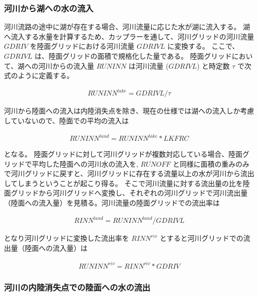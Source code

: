 \hypertarget{ux6cb3ux5dddux304bux3089ux6e56ux3078ux306eux6c34ux306eux6d41ux5165}{%
\subsubsection{河川から湖への水の流入}\label{ux6cb3ux5dddux304bux3089ux6e56ux3078ux306eux6c34ux306eux6d41ux5165}}

河川流路の途中に湖が存在する場合、河川流量に応じた水が湖に流入する。
湖へ流入する水量を計算するため、カップラーを通して、河川グリッドの河川流量
\(GDRIV\) を陸面グリッドにおける河川流量 \(GDRIVL\) に変換する。
ここで、 \(GDRIVL\) は、陸面グリッドの面積で規格化した量である。
陸面グリッドにおいて、湖への河川からの流入量 \(RUNINN\) は河川流量
(\(GDRIVL\)) と時定数 \(\tau\) で次式のように定義する。

\begin{eqnarray} RUNINN^{lake}=GDRIVL/\tau \end{eqnarray}

河川から陸面への流入は内陸消失点を除き、現在の仕様では湖への流入しか考慮していないので、陸面での平均の流入は

\begin{eqnarray} RUNINN^{land}=RUNINN^{lake}*LKFRC \end{eqnarray}

となる。
陸面グリッドに対して河川グリッドが複数対応している場合、陸面グリッドで平均した陸面への河川水の流入を,
\(RUNOFF\)
と同様に面積の重みのみで河川グリッドに戻すと、河川グリッドに存在する流量以上の水が河川から流出してしまうということが起こり得る。
そこで河川流量に対する流出量の比を陸面グリッドから河川グリッドへ変換し、それぞれの河川グリッドで河川流出量（陸面への流入量）を見積る。河川流量の陸面グリッドでの流出率は

\begin{eqnarray} RINN^{land}=RUNINN^{land}/GDRIVL \end{eqnarray}

となり河川グリッドに変換した流出率を \(RINN^{riv}\)
とすると河川グリッドでの流出量（陸面への流入量）は

\begin{eqnarray} RUNINN^{riv}=RINN^{riv}*GDRIV \end{eqnarray}

\hypertarget{ux6cb3ux5dddux306eux5185ux9678ux6d88ux5931ux70b9ux3067ux306eux9678ux9762ux3078ux306eux6c34ux306eux6d41ux51fa}{%
\subsubsection{河川の内陸消失点での陸面への水の流出}\label{ux6cb3ux5dddux306eux5185ux9678ux6d88ux5931ux70b9ux3067ux306eux9678ux9762ux3078ux306eux6c34ux306eux6d41ux51fa}}

